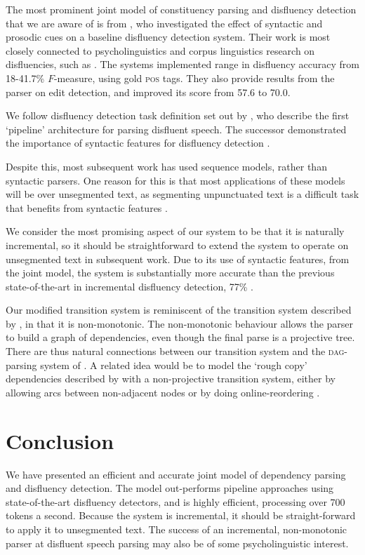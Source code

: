 \documentclass[11pt,letterpaper]{article}
\begin{document}
The most prominent joint model of constituency parsing and disfluency detection
that we are aware of is from \citet{hale:06}, who investigated the effect of
syntactic and prosodic cues on a baseline disfluency detection system.  Their
work is most closely connected to psycholinguistics and corpus linguistics research
on disfluencies, such as \citet{shriberg:98}. The systems \citeauthor{hale:06}
implemented range in disfluency accuracy from
18-41.7\% $F$-measure, using gold \textsc{pos} tags. They also provide results
from the  \citet{Charniak01a} parser on edit detection, and improved its score
from 57.6 to 70.0.

We follow disfluency detection task definition set out by 
\citet{Charniak01b}, who describe the first `pipeline' architecture for parsing
disfluent speech.  The successor
demonstrated the importance of syntactic features for disfluency detection
\citep{Johnson04a}.

Despite this, most subsequent work has used sequence models, rather than syntactic
parsers.  One reason for this is that most applications of these models will be
over unsegmented text, as segmenting unpunctuated text
is a difficult task that benefits from syntactic features \citep{zhang:13}.

We consider the most promising aspect of our system to be that it is naturally
incremental, so it should be straightforward to extend the system to operate
on unsegmented text in subsequent work.  Due to its use of syntactic features,
from the joint model, the system is substantially more accurate than the previous
state-of-the-art in incremental disfluency detection, 77\% \citep{zwarts:10}.

Our modified transition system is reminiscent
of the transition system described by \citet{honnibal:13}, in that it is
non-monotonic.  The non-monotonic behaviour allows the parser to build a graph of dependencies,
even though the final parse is a projective tree. There are thus natural connections
between our transition system and the \textsc{dag}-parsing system of \citet{sagae:08}.
A related idea would be to model the `rough copy' dependencies described by 
\citet{Johnson04a} with a non-projective transition system, either by allowing
arcs between non-adjacent nodes \citep{cohen:11} or by doing online-reordering
\citep{nivre:09}.


\section{Conclusion}

We have presented an efficient and accurate joint model of dependency parsing and
disfluency detection.  The model out-performs pipeline approaches using state-of-the-art
disfluency detectors, and is highly efficient, processing over 700 tokens a second.
Because the system is incremental, it should be straight-forward to apply it
to unsegmented text. The success of an incremental, non-monotonic parser at
disfluent speech parsing may also be of some psycholinguistic interest.



\end{document}
